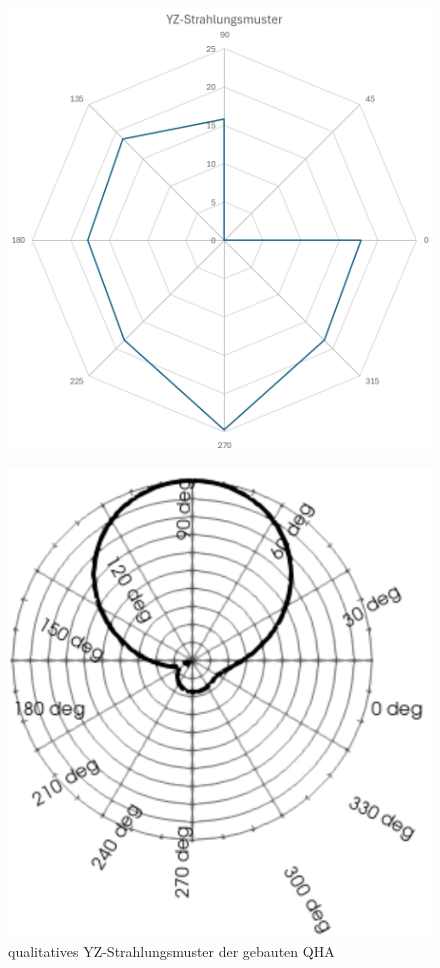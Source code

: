 \begin{figure}[H]
	\begin{minipage}[b]{.4\linewidth} %
		\includegraphics[width=\linewidth]{../ref/YZmeasuredqfh.png}
		\label{fig:YZradiationqfh}
		\caption{qualitatives YZ-Strahlungsmuster der gebauten QHA}
	\end{minipage}
	\hspace{.1\linewidth}%
	\begin{minipage}[b]{.4\linewidth} %
		\includegraphics[width=\linewidth]{../ref/YZsimulationqfh.png}

\end{minipage}
\end{figure}
